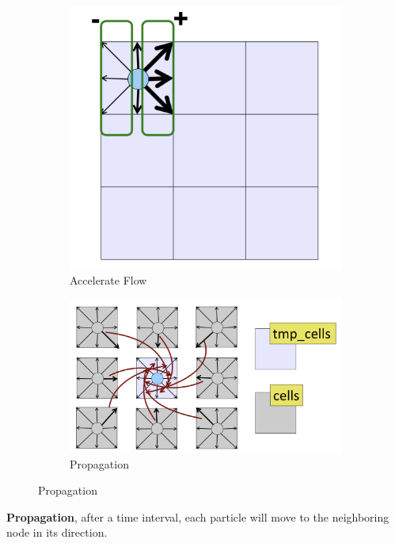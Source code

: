 \documentclass{article}
\begin{document}
\begin{figure}[h]
    \centering
    \begin{subfigure}{0.45\textwidth}
    \includegraphics[scale=0.15]{images/accelerate_flow.png} 
    \caption{Accelerate Flow}
    \label{fig:my_label}
    \end{subfigure}
    \begin{subfigure}{0.45\textwidth}
    \includegraphics[scale=0.15]{images/propagation.png}
    \caption{Propagation}
    \label{fig:my_label}
    \end{subfigure}
\end{figure}


\textbf{Propagation}, after a time interval, each particle will move to the neighboring node in its direction.
\end{document}
